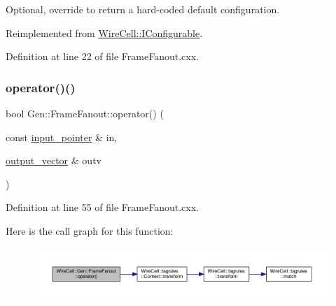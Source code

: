 Optional, override to return a hard-\/coded default configuration. 



Reimplemented from \hyperlink{class_wire_cell_1_1_i_configurable_a54841b2da3d1ea02189478bff96f7998}{Wire\+Cell\+::\+I\+Configurable}.



Definition at line 22 of file Frame\+Fanout.\+cxx.

\mbox{\label{class_wire_cell_1_1_gen_1_1_frame_fanout_ab76cea3280afa9eb3ad4b64f2e12d666}} 
\subsubsection{\texorpdfstring{operator()()}{operator()()}}
{\footnotesize\ttfamily bool Gen\+::\+Frame\+Fanout\+::operator() (\begin{DoxyParamCaption}\item[{const \hyperlink{class_wire_cell_1_1_i_fanout_node_aefd36d56a531edf1990fe6e263d9c266}{input\+\_\+pointer} \&}]{in,  }\item[{\hyperlink{class_wire_cell_1_1_i_fanout_node_a650cda83709781daac2d67af7c3706df}{output\+\_\+vector} \&}]{outv }\end{DoxyParamCaption})\hspace{0.3cm}{\ttfamily [virtual]}}



Definition at line 55 of file Frame\+Fanout.\+cxx.

Here is the call graph for this function\+:
\nopagebreak
\begin{figure}[H]
\begin{center}
\leavevmode
\includegraphics[width=350pt]{class_wire_cell_1_1_gen_1_1_frame_fanout_ab76cea3280afa9eb3ad4b64f2e12d666_cgraph}
\end{center}
\end{figure}
\mbox{\label{class_wire_cell_1_1_gen_1_1_frame_fanout_a71041fd4bf1a0e030e78a7565f7f1671}} 
